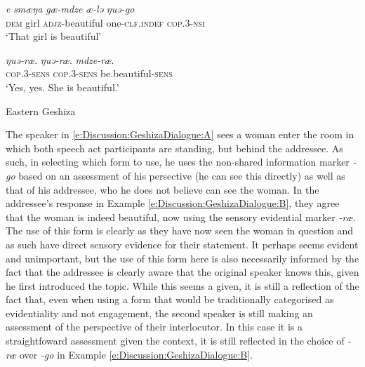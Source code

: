 \begin{exe}
    \ex\label{e:Discussion:GeshizaDialogue}
    \begin{xlist}
        \ex\label{e:Discussion:GeshizaDialogue:A}
        \gll \textit{e} \textit{smæŋa} \textit{gæ-mdze} \textit{æ-lə} \textit{ŋuə-go} \\
        \textsc{dem} girl \textsc{adjz}-beautiful one-\textsc{clf.indef} \textsc{cop.3-nsi} \\
        \glt `That girl is beautiful'

        \ex\label{e:Discussion:GeshizaDialogue:B}
        \gll \textit{ŋuə-ræ}. \textit{ŋuə-ræ}. \textit{mdze-ræ}. \\
        \textsc{cop.3-sens} \textsc{cop.3-sens} be.beautiful-\textsc{sens} \\
        \glt `Yes, yes. She is beautiful.'
    \end{xlist}
    Eastern Geshiza \cite[rGyalrongic: PRC,][593]{Honkasalo2019}
\end{exe}

The speaker in \ref{e:Discussion:GeshizaDialogue:A} sees a woman enter the room in which both speech act participants are standing, but behind the addressee. As such, in selecting which form to use, he uses the non-shared information marker \textit{-go} based on an assessment of his persective (he can see this directly) as well as that of his addressee, who he does not believe can see the woman. In the addressee's response in Example \ref{e:Discussion:GeshizaDialogue:B}, they agree that the woman is indeed beautiful, now using the sensory evidential marker \textit{-ræ}. The use of this form is clearly as they have now seen the woman in question and as such have direct sensory evidence for their statement. It perhaps seems evident and unimportant, but the use of this form here is also necessarily informed by the fact that the addressee is clearly aware that the original speaker knows this, given he first introduced the topic. While this seems a given, it is still a reflection of the fact that, even when using a form that would be traditionally categorised as evidentiality and not engagement, the second speaker is still making an assessment of the perspective of their interlocutor. In this case it is a straightfoward assessment given the context, it is still reflected in the choice of \textit{-ræ} over \textit{-go} in Example \ref{e:Discussion:GeshizaDialogue:B}.

